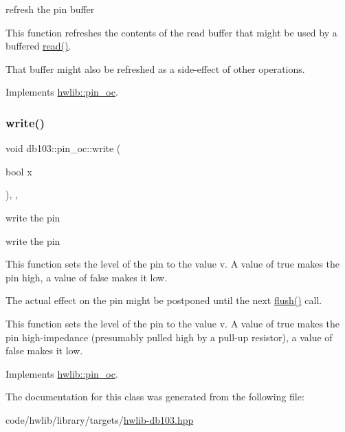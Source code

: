 refresh the pin buffer

This function refreshes the contents of the read buffer that might be used by a buffered \hyperlink{classdb103_1_1pin__oc_ae48de2077c383bcab947278ee6564398}{read()}.

That buffer might also be refreshed as a side-\/effect of other operations. 

Implements \hyperlink{classhwlib_1_1pin__oc_a573740f6f790c5792efc9cdd44cc73b3}{hwlib\+::pin\+\_\+oc}.

\mbox{\label{classdb103_1_1pin__oc_a77912a9a646cb67030854d69d911acbd}} 
\subsubsection{\texorpdfstring{write()}{write()}}
{\footnotesize\ttfamily void db103\+::pin\+\_\+oc\+::write (\begin{DoxyParamCaption}\item[{bool}]{x }\end{DoxyParamCaption})\hspace{0.3cm}{\ttfamily [inline]}, {\ttfamily [override]}, {\ttfamily [virtual]}}





write the pin

write the pin

This function sets the level of the pin to the value v. A value of true makes the pin high, a value of false makes it low.

The actual effect on the pin might be postponed until the next \hyperlink{classdb103_1_1pin__oc_a9aa19305905fe3a647fe1fa50a243dae}{flush()} call.

This function sets the level of the pin to the value v. A value of true makes the pin high-\/impedance (presumably pulled high by a pull-\/up resistor), a value of false makes it low. 

Implements \hyperlink{classhwlib_1_1pin__oc_a4429dd7dc80858a213bb157f4ac5def3}{hwlib\+::pin\+\_\+oc}.



The documentation for this class was generated from the following file\+:\begin{DoxyCompactItemize}
\item 
code/hwlib/library/targets/\hyperlink{hwlib-db103_8hpp}{hwlib-\/db103.\+hpp}\end{DoxyCompactItemize}
